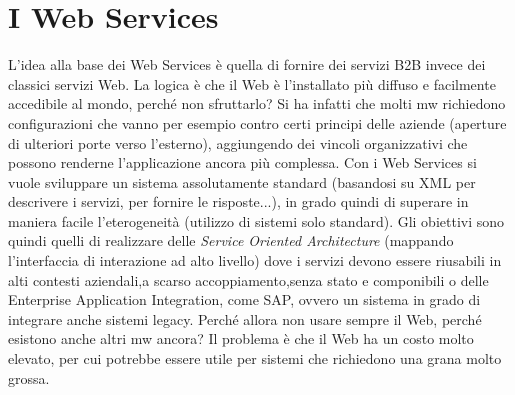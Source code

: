 \chapter{I Web Services}
L'idea alla base dei Web Services è quella di fornire dei servizi B2B invece dei classici servizi Web. La logica è che
il Web è l'installato più diffuso e facilmente accedibile al mondo, perché non sfruttarlo?
Si ha infatti che molti mw richiedono configurazioni che vanno per esempio contro certi principi delle aziende
(aperture di ulteriori porte verso l'esterno), aggiungendo dei vincoli organizzativi che possono renderne
l'applicazione ancora più complessa.
Con i Web Services si vuole sviluppare un sistema assolutamente standard (basandosi su XML per descrivere i servizi,
per fornire le risposte...), in grado quindi di superare in maniera facile l'eterogeneità (utilizzo di sistemi solo
standard). Gli obiettivi sono quindi quelli di realizzare delle \textit{Service Oriented Architecture} (mappando
l'interfaccia di interazione ad alto livello) dove i servizi devono essere riusabili in alti contesti aziendali,a scarso accoppiamento,senza stato e componibili o delle Enterprise Application Integration, come SAP, ovvero un sistema
in grado di integrare anche sistemi legacy.
Perché allora non usare sempre il Web, perché esistono anche altri mw ancora? Il problema è che il Web ha un costo
molto elevato, per cui potrebbe essere utile per sistemi che richiedono una grana molto grossa.
